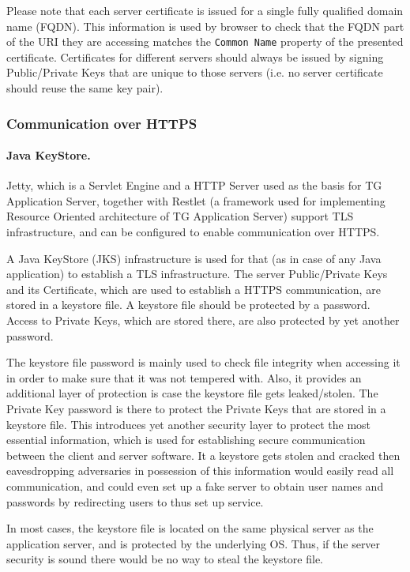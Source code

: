 \documentclass[a4paper,12pt,oneside,openright]{memoir}
\begin{document}
	Please note that each server certificate is issued for a single fully qualified domain name (FQDN).
	This information is used by browser to check that the FQDN part of the URI they are accessing matches the \texttt{Common Name} property of the presented certificate.
	Certificates for different servers should always be issued by signing Public/Private Keys that are unique to those servers (i.e. no server certificate should reuse the same key pair).

\subsubsection*{Communication over HTTPS}

	\paragraph{Java KeyStore.}
	Jetty, which is a Servlet Engine and a HTTP Server used as the basis for TG Application Server, together with Restlet (a framework used for implementing Resource Oriented architecture of TG Application Server) support TLS infrastructure, and can be configured to enable communication over HTTPS.

	A Java KeyStore (JKS) infrastructure is used for that (as in case of any Java application) to establish a TLS infrastructure.
	The server Public/Private Keys and its Certificate, which are used to establish a HTTPS communication, are stored in a keystore file.
	A keystore file should be protected by a password. Access to Private Keys, which are stored there, are also protected by yet another password.

	The keystore file password is mainly used to check file integrity when accessing it in order to make sure that it was not tempered with.
	Also, it provides an additional layer of protection is case the keystore file gets leaked/stolen.
	The Private Key password is there to protect the Private Keys that are stored in a keystore file.
	This introduces yet another security layer to protect the most essential information, which is used for establishing secure communication between the client and server software.
	It a keystore gets stolen and cracked then eavesdropping adversaries in possession of this information would easily read all communication, and could even set up a fake server to obtain user names and passwords by redirecting users to thus set up service.

	In most cases, the keystore file is located on the same physical server as the application server, and is protected by the underlying OS.
	Thus, if the server security is sound there would be no way to steal the keystore file.
\end{document}
